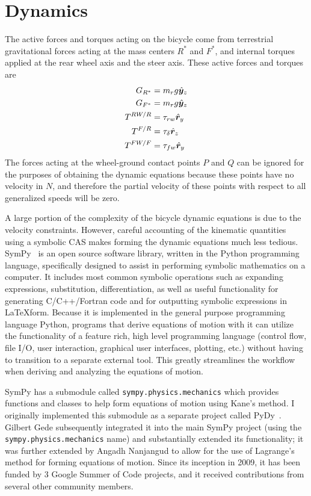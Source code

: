 \section{Dynamics} \label{model:dynamics}
The active forces and torques acting on the bicycle come from terrestrial gravitational
forces acting at the mass centers $R^*$ and $F^*$, and internal torques applied
at the rear wheel axis and the steer axis. These active forces and torques are
\begin{align}
  G_{R^*} &= m_r g \hat{\boldsymbol{y}}_{z} \\
  G_{F^*} &= m_r g \hat{\boldsymbol{y}}_{z} \\
  T^{RW/R}&= \tau_{rw} \hat{\boldsymbol{r}}_{y} \\
  T^{F/R}&= \tau_{\delta} \hat{\boldsymbol{r}}_{z} \\
  T^{FW/F}&= \tau_{fw} \hat{\boldsymbol{r}}_{y}
\end{align}
The forces acting at the wheel-ground contact points $P$ and $Q$ can be ignored
for the purposes of obtaining the dynamic equations because these points have
no velocity in $N$, and therefore the partial velocity of these points with
respect to all generalized speeds will be zero.

A large portion of the complexity of the bicycle dynamic equations is due to
the velocity constraints. However, careful accounting of the kinematic
quantities using a symbolic CAS makes forming the dynamic equations much less
tedious. SymPy~\cite{SymPy} is an open source software library, written in the
Python programming language, specifically designed to assist in performing
symbolic mathematics on a computer. It includes most common symbolic operations
such as expanding expressions, substitution, differentiation, as well as useful
functionality for generating C/C++/Fortran code and for outputting symbolic
expressions in \LaTeX form. Because it is implemented in the general purpose
programming language Python, programs that derive equations of motion with it
can utilize the functionality of a feature rich, high level programming
language (control flow, file I/O, user interaction, graphical user interfaces,
plotting, etc.) without having to transition to a separate external tool. This
greatly streamlines the workflow when deriving and analyzing the equations of
motion.

SymPy has a submodule called \verb|sympy.physics.mechanics| which provides
functions and classes to help form equations of motion using Kane's method. I
originally implemented this submodule as a separate project called
PyDy~\cite{PyDy}. Gilbert Gede subsequently integrated it into the main SymPy
project (using the \verb|sympy.physics.mechanics| name) and substantially
extended its functionality; it was further extended by Angadh Nanjangud to
allow for the use of Lagrange's method for forming equations of motion. Since
its inception in 2009, it has been funded by 3 Google Summer of Code projects,
and it received contributions from several other community members.

